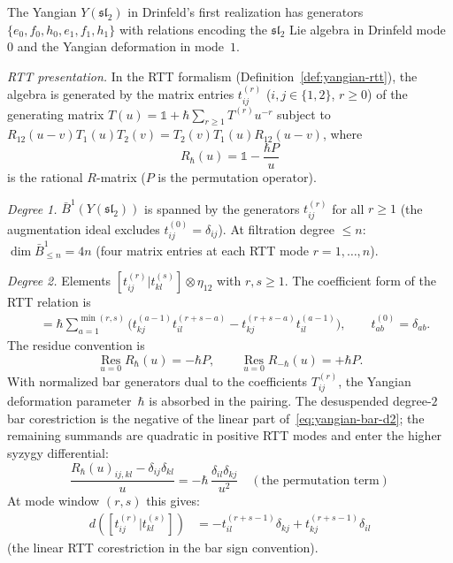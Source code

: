 \begin{computation}
\label{comp:yangian-sl2-bar}

The Yangian $Y(\mathfrak{sl}_2)$ in Drinfeld's first realization
has generators $\{e_0, f_0, h_0, e_1, f_1, h_1\}$ with
relations encoding the $\mathfrak{sl}_2$ Lie algebra in Drinfeld
mode~$0$ and the Yangian deformation in mode~$1$.

\emph{RTT presentation.}
In the RTT formalism (Definition~\ref{def:yangian-rtt}), the
algebra is generated by the matrix entries $t_{ij}^{(r)}$
($i,j \in \{1,2\}$, $r \geq 0$) of the generating matrix
$T(u)=\mathbb{1}+\hbar\sum_{r \geq 1}T^{(r)}u^{-r}$ subject to
$R_{12}(u-v) T_1(u) T_2(v) = T_2(v) T_1(u) R_{12}(u-v)$,
where
\[
R_\hbar(u)=\mathbb{1}-\frac{\hbar P}{u}
\]
is the rational $R$-matrix
($P$ is the permutation operator).

\emph{Degree 1.}
$\bar{B}^1(Y(\mathfrak{sl}_2))$ is spanned by the
generators $t_{ij}^{(r)}$ for all $r \geq 1$
(the augmentation ideal excludes $t_{ij}^{(0)} = \delta_{ij}$).
At filtration degree $\leq n$: $\dim \bar{B}^1_{\leq n}
= 4n$ (four matrix entries at each RTT mode $r = 1, \ldots, n$).

\emph{Degree 2.}
Elements $[t_{ij}^{(r)} | t_{kl}^{(s)}] \otimes \eta_{12}$
with $r, s \geq 1$. The coefficient form of the RTT relation is
\begin{align}
[t_{ij}^{(r)},t_{kl}^{(s)}]
&=
\hbar\sum_{a=1}^{\min(r,s)}
\bigl(
t_{kj}^{(a-1)}t_{il}^{(r+s-a)}
-t_{kj}^{(r+s-a)}t_{il}^{(a-1)}
\bigr),
\qquad t_{ab}^{(0)}=\delta_{ab}.
\label{eq:yangian-bar-d2}
\end{align}
The residue convention is
\[
\operatorname*{Res}_{u=0}R_\hbar(u)=-\hbar P,\qquad
\operatorname*{Res}_{u=0}R_{-\hbar}(u)=+\hbar P.
\]
With normalized bar generators dual to the coefficients
$T_{ij}^{(r)}$, the Yangian deformation parameter~$\hbar$ is absorbed
in the pairing. The desuspended degree-$2$ bar corestriction is the
negative of the linear part of~\eqref{eq:yangian-bar-d2}; the
remaining summands are quadratic in positive RTT modes and enter the
higher syzygy differential:
\[
\frac{R_\hbar(u)_{ij,kl} - \delta_{ij}\delta_{kl}}{u}
= -\hbar\,\frac{\delta_{il}\delta_{kj}}{u^2}
\quad (\text{the permutation term})
\]
At mode window $(r,s)$ this gives:
\begin{align}
d([t_{ij}^{(r)} | t_{kl}^{(s)}]) &=
-t_{il}^{(r+s-1)} \delta_{kj} + t_{kj}^{(r+s-1)} \delta_{il}
\label{eq:yangian-d2-explicit}
\end{align}
(the linear RTT corestriction in the bar sign convention).


\end{computation}
